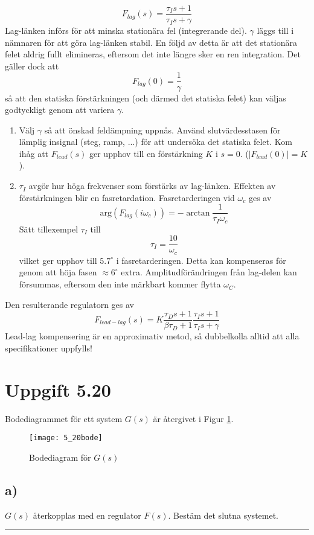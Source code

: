 \documentclass[12pt]{article}
\newcommand{\qline}{\hrule \vspace*{10pt}}
\begin{document}
\[F_{lag}(s) = \frac{\tau_Is+1}{\tau_Is+\gamma}  \]
Lag-länken införs för att minska stationära fel (integrerande del). $\gamma$ läggs till i nämnaren för att göra lag-länken stabil. En följd av detta är att det stationära felet aldrig fullt elimineras, eftersom det inte längre sker en ren integration. Det gäller dock att 
\[F_{lag}(0) = \frac{1}{\gamma}\]
så att den statiska förstärkningen (och därmed det statiska felet) kan väljas godtyckligt genom att variera $\gamma$.
\begin{enumerate}
\item Välj $\gamma$ så att önskad feldämpning uppnås. Använd slutvärdesstasen för lämplig insignal (steg, ramp, ...) för att undersöka det statiska felet. Kom ihåg att $F_{lead}(s)$ ger upphov till en förstärkning $K$ i $s = 0$. ($|F_{lead}(0)| = K$).
\item $\tau_I$ avgör hur höga frekvenser som förstärks av lag-länken. Effekten av förstärkningen blir en fasretardation. Fasretarderingen vid $\omega_c$ ges av
  \[\mathrm{arg}(F_{lag}(i\omega_c)) = -\arctan{\frac{1}{\tau_I \omega_c}}\]
Sätt tillexempel $\tau_I$ till 
\[\tau_I = \frac{10}{\omega_c}\]
vilket ger upphov till $5.7^{\circ}$ i fasretarderingen. Detta kan kompenseras för genom att höja fasen $\approx 6^{\circ}$ extra. Amplitudförändringen från lag-delen kan försummas, eftersom den inte märkbart kommer flytta $\omega_C$.
\end{enumerate}

Den resulterande regulatorn ges av 
\[F_{lead-lag}(s) = K \frac{\tau_Ds + 1}{\beta\tau_D + 1} \frac{\tau_Is +1}{\tau_Is+\gamma}\]
Lead-lag kompensering är en approximativ metod, så dubbelkolla alltid att alla specifikationer uppfylls!

\section*{Uppgift 5.20}
Bodediagrammet för ett system $G(s)$ är återgivet i Figur \ref{fig:5_20bode}.
\begin{figure}[h!]
  \centering
  \texttt{[image: 5\_20bode]}
  \caption{Bodediagram för $G(s)$}
  \label{fig:5_20bode}
\end{figure}
\FloatBarrier

\subsection*{a)}
$G(s)$ återkopplas med en regulator $F(s)$. Bestäm det slutna systemet.
\qline
\end{document}
